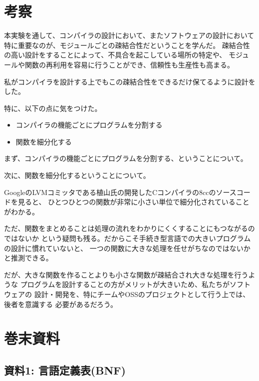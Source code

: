 \documentclass[11pt,a4j]{jarticle}
\begin{document}

\section{考察}

本実験を通して、コンパイラの設計において、またソフトウェアの設計において
特に重要なのが、モジュールごとの疎結合性だということを学んだ。
疎結合性の高い設計をすることによって、不具合を起こしている場所の特定や、
モジュールや関数の再利用を容易に行うことができ、信頼性も生産性も高まる。

私がコンパイラを設計する上でもこの疎結合性をできるだけ保てるように設計をした。

特に、以下の点に気をつけた。

\begin{itemize}
    \item コンパイラの機能ごとにプログラムを分割する
    \item 関数を細分化する
\end{itemize}


まず、コンパイラの機能ごとにプログラムを分割する、ということについて。


次に、関数を細分化するということについて。

GoogleのLVMコミッタである植山氏の開発したCコンパイラの8ccのソースコードを見ると、
ひとつひとつの関数が非常に小さい単位で細分化されていることがわかる。

ただ、関数をまとめることは処理の流れをわかりにくくすることにもつながるのではないか
という疑問も残る。だからこそ手続き型言語での大きいプログラムの設計に慣れていないと、
一つの関数に大きな処理を任せがちなのではないかと推測できる。

だが、大きな関数を作ることよりも小さな関数が疎結合され大きな処理を行うような
プログラムを設計することの方がメリットが大きいため、私たちがソフトウェアの
設計・開発を、特にチームやOSSのプロジェクトとして行う上では、後者を意識する
必要があるだろう。




\section{巻末資料}

\subsection{資料1: 言語定義表(BNF)}
\end{document}
